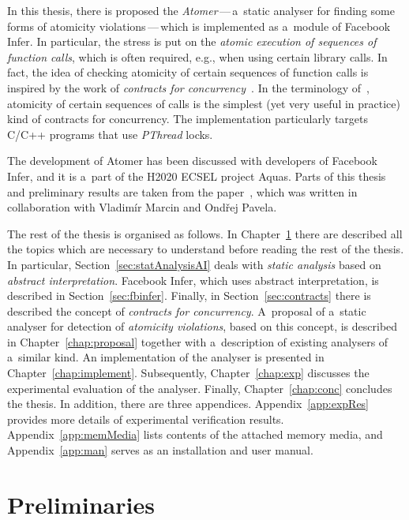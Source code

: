 In this thesis, there is proposed the \emph{Atomer}\,---\,a~static
analyser for finding some forms of atomicity violations\,---\,which is
implemented as a~module of Facebook Infer. In particular, the stress
is put on the \emph{atomic execution of sequences of function calls}, which is
often required, e.g., when using certain library calls. In fact, the idea
of checking atomicity of certain sequences of function calls is inspired
by the work of \emph{contracts for concurrency}~\cite{contracts2017}. In
the terminology of~\cite{contracts2017}, atomicity of certain sequences
of calls is the simplest (yet very useful in practice) kind of contracts
for concurrency. The implementation particularly targets C/C++ programs
that use \emph{PThread} locks.

The development of Atomer has been discussed with developers of
Facebook Infer, and it is a~part of the H2020 ECSEL project Aquas. Parts
of this thesis and preliminary results are taken from the
paper~\cite{excel2019FBInfer}, which was written in collaboration with
Vladimír Marcin and Ondřej Pavela.

The rest of the thesis is organised as follows. In
Chapter~\ref{chap:prelim} there are described all the topics
which are necessary to understand before reading the rest of the thesis. In
particular, Section~\ref{sec:statAnalysisAI} deals with
\emph{static analysis} based on \emph{abstract interpretation}.
Facebook Infer, which uses abstract interpretation, is described in
Section~\ref{sec:fbinfer}. Finally, in Section~\ref{sec:contracts} there is
described the concept of \emph{contracts for concurrency}. A~proposal of
a~static analyser for detection of \emph{atomicity violations}, based on this
concept, is described in Chapter~\ref{chap:proposal} together with
a~description of existing analysers of a~similar kind. An implementation
of the analyser is presented in Chapter~\ref{chap:implement}. Subsequently,
Chapter~\ref{chap:exp} discusses the experimental evaluation of the analyser.
Finally, Chapter~\ref{chap:conc} concludes the thesis. In addition, there are
three appendices. Appendix~\ref{app:expRes} provides more details of
experimental verification results. Appendix~\ref{app:memMedia} lists contents
of the attached memory media, and Appendix~\ref{app:man} serves as an
installation and user manual.



\chapter{Preliminaries}
\label{chap:prelim}

